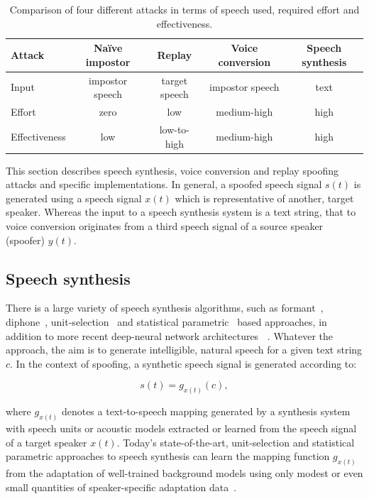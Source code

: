 \begin{table}
\renewcommand{\arraystretch}{1.3}
\begin{center}
    \begin{tabular}{ l | c c c c }
    \hline
     	 Attack & Na\"{i}ve impostor &  Replay & Voice conversion & Speech synthesis\\ 
    \hline
Input         & impostor speech  & target speech & impostor speech & text\\
Effort        & zero & low & medium-high & high\\
Effectiveness & low &  low-to-high & medium-high & high\\
 \hline
\hline
    \end{tabular}
    \caption{Comparison of four different attacks in terms of speech used,  required effort and effectiveness.}
		\label{tab::attacks}
   \end{center}
\end{table}

This section describes speech synthesis, voice conversion and replay spoofing attacks and specific implementations.  In general, a spoofed speech signal $s(t)$ is generated using a speech signal $x(t)$ which is representative of another, target speaker.  Whereas the input to a speech synthesis system is a text string, that to voice conversion originates from a third speech signal of a source speaker (spoofer) $y(t)$.  



\subsection{Speech synthesis}
\label{ssec:spsyn}

There is a large variety of speech synthesis algorithms, such as formant~\cite{Klatt1980}, diphone~\cite{Moulines1990}, unit-selection~\cite{Hunt1996} and statistical parametric~\cite{Tokuda2000} based approaches, in addition to more recent deep-neural network architectures {\bfseries ~\cite{Zen2013}}.  Whatever the approach, the aim is to generate intelligible, natural speech for a given text string $c$. In the context of spoofing, a synthetic speech signal is generated according to:

\begin{equation}
s(t) = g_{x(t)}(c),
\label{eq:tts}
\end{equation}

\noindent where $g_{x(t)}$ denotes a text-to-speech mapping generated by a synthesis system with speech units or acoustic models extracted or learned from the speech signal of a target speaker $x(t)$.  Today's state-of-the-art, unit-selection and statistical parametric approaches to speech synthesis can learn the mapping function $g_{x(t)}$ from the adaptation of well-trained background models using only modest or even small quantities of speaker-specific adaptation data~\cite{Zen2007a}.  


